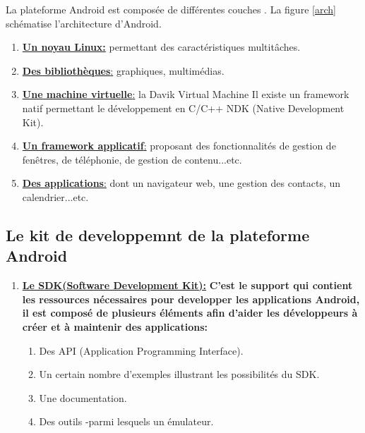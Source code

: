 \documentclass[french,a4,12pt]{report}
\begin{document}
\textsf{ La plateforme Android est composée de différentes couches . La figure \ref{arch} schématise l'architecture d'Android.}
\begin{enumerate}%
			\item{ \underline{ \textbf{Un noyau Linux:}}}
	permettant des caractéristiques multitâches.
	\item { \underline{ \textbf{Des bibliothèques}:}}
	graphiques, multimédias.
	\item { \underline{ \textbf{Une machine virtuelle}:}}
   la Davik Virtual Machine Il existe un framework natif permettant le développement en C/C++ NDK (Native Development Kit).
	\item{ \underline{ \textbf{Un framework applicatif}:}}
	proposant des fonctionnalités de gestion de fenêtres, de téléphonie, de gestion de contenu...etc.
	\item { \underline{ \textbf{Des applications}:}}
	dont un navigateur web, une gestion des contacts, un calendrier...etc.
\end{enumerate}
\begin{tcolorbox}[colframe=green!75,rightrule=0.5cm,leftrule=0.5cm,]
	\centering
\subsection{Le kit de developpemnt de la plateforme Android}
\end{tcolorbox}
\begin{enumerate}[label=\textcolor{blue}{$\rhd$}]
	\item{ \underline{ \textbf{Le SDK(Software Development Kit):}}}
\textbf{C'est le support qui contient les ressources nécessaires pour developper les applications Android, il est composé de plusieurs éléments afin d’aider les développeurs à créer et à maintenir des applications:}
\begin{enumerate} [label=\textcolor{blue}{$\rhd\rhd$}]
	\item Des API (Application Programming Interface).
	\item Un certain nombre d'exemples illustrant les possibilités du SDK.
	\item Une  documentation.
	\item Des outils -parmi lesquels un émulateur.
\end{enumerate}
\end{enumerate}
\end{document}

